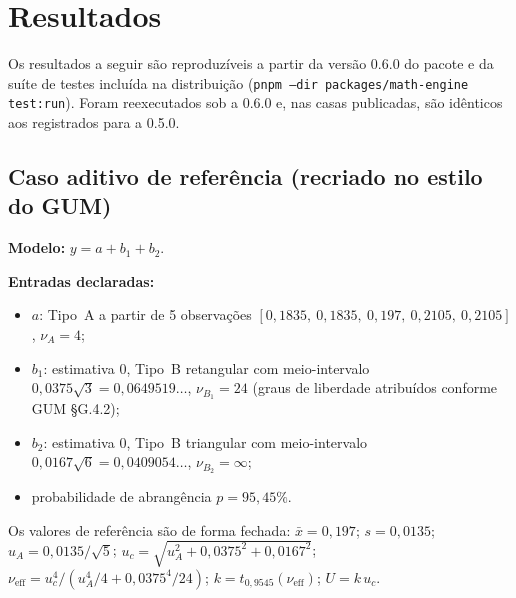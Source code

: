 \documentclass[11pt,a4paper]{article}
\newcommand{\docVersion}{0.6.0}
\newcommand{\previousVersion}{0.5.0}
\begin{document}
\section{Resultados}
\label{sec:resultados}

Os resultados a seguir são reproduzíveis a partir da versão \docVersion{} do pacote e da suíte de testes incluída na distribuição (\texttt{pnpm --dir packages/math-engine test:run}). Foram reexecutados sob a \docVersion{} e, nas casas publicadas, são idênticos aos registrados para a \previousVersion{}.

\subsection{Caso aditivo de referência (recriado no estilo do GUM)}

\textbf{Modelo:} \(y = a + b_1 + b_2\).

\textbf{Entradas declaradas:}
\begin{itemize}
  \item \(a\): Tipo~A a partir de 5 observações \([0{,}1835,\ 0{,}1835,\ 0{,}197,\ 0{,}2105,\ 0{,}2105]\), \(\nu_A = 4\);
  \item \(b_1\): estimativa 0, Tipo~B retangular com meio-intervalo \(0{,}0375\sqrt{3} = 0{,}0649519\ldots\), \(\nu_{B_1} = 24\) (graus de liberdade atribuídos conforme GUM §G.4.2);
  \item \(b_2\): estimativa 0, Tipo~B triangular com meio-intervalo \(0{,}0167\sqrt{6} = 0{,}0409054\ldots\), \(\nu_{B_2} = \infty\);
  \item probabilidade de abrangência \(p = 95{,}45\%\).
\end{itemize}

Os valores de referência são de forma fechada: \(\bar{x} = 0{,}197\); \(s = 0{,}0135\); \(u_A = 0{,}0135/\sqrt{5}\); \(u_c = \sqrt{u_A^2 + 0{,}0375^2 + 0{,}0167^2}\); \(\nu_{\text{eff}} = u_c^4 / (u_A^4/4 + 0{,}0375^4/24)\); \(k = t_{0{,}9545}(\nu_{\text{eff}})\); \(U = k\,u_c\).
\end{document}
